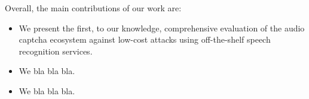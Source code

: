 Overall, the main contributions of our work are:

\begin{itemize}

\item We present the first, to our knowledge, comprehensive evaluation of 
the audio captcha ecosystem against low-cost 
attacks using off-the-shelf speech recognition services.

\item We bla bla bla.

\item We bla bla bla.

\end{itemize}
